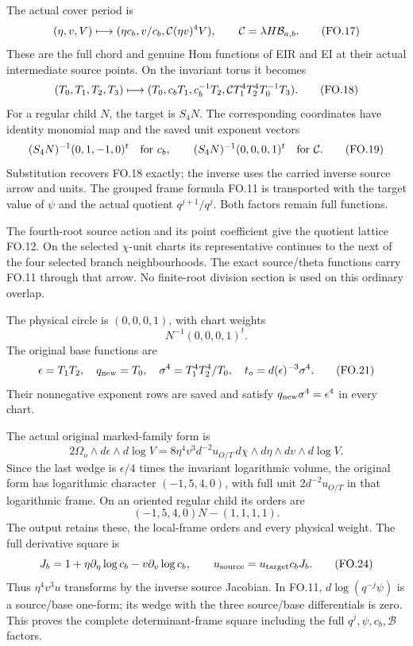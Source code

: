 The actual cover period is
\[
 (\eta,v,V)\longmapsto
 (\eta c_b,v/c_b,{\cal C}(\eta v)^4V),\qquad
 {\cal C}=\lambda H\mathcal B_{a,b}.                        \tag{FO.17}
\]
These are the full chord and genuine Hom functions
of EIR and EI at their actual intermediate source
points. On the invariant torus it becomes
\[
 (T_0,T_1,T_2,T_3)\longmapsto
 (T_0,c_bT_1,c_b^{-1}T_2,
      {\cal C}T_1^4T_2^4T_0^{-1}T_3).                     \tag{FO.18}
\]
For a regular child \(N\), the target is \(S_4N\).
The corresponding coordinates have identity monomial
map and the saved unit exponent vectors
\[
 (S_4N)^{-1}(0,1,-1,0)^t\quad\text{for }c_b,\qquad
 (S_4N)^{-1}(0,0,0,1)^t\quad\text{for }{\cal C}.             \tag{FO.19}
\]
Substitution recovers FO.18 exactly; the inverse
uses the carried inverse source arrow and units.
The grouped frame formula FO.11 is transported with
the target value of \(\psi\) and the actual quotient
\(q^{j+1}/q^j\). Both factors remain full functions.

The fourth-root source action and its point coefficient
give the quotient lattice FO.12. On the selected
\(\chi\)-unit charts its representative continues to
the next of the four selected branch neighbourhoods.
The exact source/theta functions carry FO.11 through
that arrow. No finite-root division section is used
on this ordinary overlap.

The physical circle is \((0,0,0,1)\), with chart weights
\[
 N^{-1}(0,0,0,1)^t.                                        \tag{FO.20}
\]
The original base functions are
\[
 \epsilon=T_1T_2,\quad q_{\rm new}=T_0,\quad
 \sigma^4=T_1^4T_2^4/T_0,\quad
 t_o=d(\epsilon)^{-3}\sigma^4.                             \tag{FO.21}
\]
Their nonnegative exponent rows are saved and satisfy
\(q_{\rm new}\sigma^4=\epsilon^4\) in every chart.

The actual original marked-family form is
\[
 2\Omega_o\wedge d\epsilon\wedge d\log V
 =8\eta^4v^3d^{-2}u_{O/T}\,
       d\chi\wedge d\eta\wedge dv\wedge d\log V.            \tag{FO.22}
\]
Since the last wedge is \(\epsilon/4\) times the
invariant logarithmic volume, the original form has
logarithmic character \((-1,5,4,0)\), with full unit
\(2d^{-2}u_{O/T}\) in that logarithmic frame.
On an oriented regular child its orders are
\[
 (-1,5,4,0)N-(1,1,1,1).                                   \tag{FO.23}
\]
The output retains these, the local-frame orders and
every physical weight. The full derivative square is
\[
 J_b=1+\eta\partial_\eta\log c_b-v\partial_v\log c_b,
 \qquad u_{\rm source}=u_{\rm target}c_bJ_b.                \tag{FO.24}
\]
Thus \(\eta^4v^3u\) transforms by the inverse source
Jacobian. In FO.11, \(d\log(q^{-j}\psi)\) is a
source/base one-form; its wedge with the three
source/base differentials is zero. This proves the
complete determinant-frame square including the
full \(q^j,\psi,c_b,\mathcal B\) factors.

